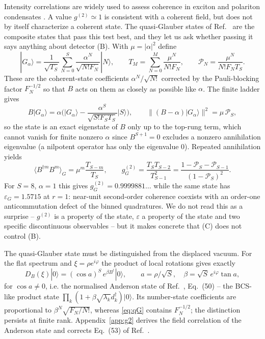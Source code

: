 \documentclass[11pt,a4paper]{article}
\newcommand{\ket}[1]{|#1\rangle}
\begin{document}
Intensity correlations are widely used to assess coherence in exciton and polariton condensates \cite{Deng2010}. A value $g^{(2)}\simeq1$ is consistent with a coherent field, but does not by itself characterize a coherent state. The quasi-Glauber states of Ref.~\cite{Shiau2017} are the composite states that pass this test best, and they let us ask whether passing it says anything about detector (B). With $\mu=|\alpha|^2$ define
\begin{equation}
\ket{G_\alpha}=\frac1{\sqrt{T_S}}\sum_{N=0}^S\frac{\alpha^N}{\sqrt{N!F_N}}\ket N,\qquad
T_M=\sum_{N=0}^M\frac{\mu^N}{N!F_N},\qquad \mathcal P_N=\frac{\mu^N}{N!F_NT_S}.
\label{eq:qG}
\end{equation}
These are the coherent-state coefficients $\alpha^N/\sqrt{N!}$ corrected by the Pauli-blocking factor $F_N^{-1/2}$ so that $B$ acts on them as closely as possible like $\alpha$. The finite ladder gives
\begin{equation}
B\ket{G_\alpha}=\alpha\Big(\ket{G_\alpha}-\frac{\alpha^S}{\sqrt{S!F_ST_S}}\ket S\Big),\qquad
\|(B-\alpha)\ket{G_\alpha}\|^2=\mu\,\mathcal P_S ,
\label{eq:qGeig}
\end{equation}
so the state is an exact eigenstate of $B$ only up to the top-rung term, which cannot vanish for finite nonzero $\alpha$ since $B^{S+1}=0$ excludes a nonzero annihilation eigenvalue (a nilpotent operator has only the eigenvalue $0$). Repeated annihilation yields
\begin{equation}
\langle B^{\dagger m}B^m\rangle_G=\mu^m\frac{T_{S-m}}{T_S},\qquad
g^{(2)}_G=\frac{T_ST_{S-2}}{T_{S-1}^2}=\frac{1-\mathcal P_S-\mathcal P_{S-1}}{(1-\mathcal P_S)^2}.
\label{eq:g2G}
\end{equation}
For $S=8$, $\alpha=1$ this gives $g^{(2)}_G=0.9999881\ldots$ while the same state has $\varepsilon_G=1.5715$ at $r=1$: near-unit second-order coherence coexists with an order-one anticommutation defect of the binned quadratures. We do not read this as a surprise -- $g^{(2)}$ is a property of the state, $\varepsilon$ a property of the state and two specific discontinuous observables -- but it makes concrete that (C) does not control (B).

The quasi-Glauber state must be distinguished from the displaced vacuum. For the flat spectrum and $\xi=\rho e^{i\varphi}$ the product of local rotations gives exactly
\begin{equation}
D_B(\xi)\ket0=(\cos a)^S\,e^{\beta B^\dagger}\ket0,\qquad a=\rho/\sqrt S,\quad \beta=\sqrt S\,e^{i\varphi}\tan a,
\label{eq:anderson}
\end{equation}
for $\cos a\ne0$, i.e. the normalised Anderson state \cite{Anderson1958} of Ref.~\cite{Shiau2017}, Eq.~(50) -- the BCS-like product state $\prod_k(1+\beta\sqrt{\lambda_k}d_k^\dagger)\ket0$. Its number-state coefficients are proportional to $\beta^N\sqrt{F_N/N!}$, whereas \eqref{eq:qG} contains $F_N^{-1/2}$; the distinction persists at finite rank. Appendix~\ref{app:g2} derives the field correlation of the Anderson state and corrects Eq.~(53) of Ref.~\cite{Shiau2017}.
\end{document}
